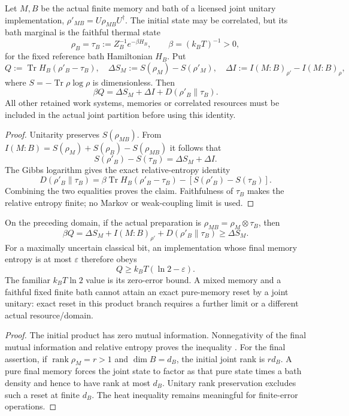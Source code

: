 \documentclass[12pt,a4paper]{article}
\begin{document}
\begin{theorem}
\label{p4:thm:v2211-correlated-landauer}
Let \(M,B\) be the actual finite memory and bath of a licensed joint
unitary implementation, \(\rho'_{MB}=U\rho_{MB}U^\dagger\).  The initial
state may be correlated, but its bath marginal is the faithful thermal state
\[
 \rho_B=\tau_B:=Z_B^{-1}e^{-\beta H_B},\qquad
 \beta=(k_BT)^{-1}>0,
\]
for the fixed reference bath Hamiltonian \(H_B\).  Put
\[
 Q:=\operatorname{Tr}H_B(\rho'_B-\tau_B),\quad
 \Delta S_M:=S(\rho_M)-S(\rho'_M),\quad
 \Delta I:=I(M:B)_{\rho'}-I(M:B)_\rho,
\]
where \(S=-\operatorname{Tr}\rho\log\rho\) is dimensionless.  Then
\begin{equation}
 \boxed{\beta Q=\Delta S_M+\Delta I+
              D(\rho'_B\|\tau_B).}
 \label{p4:eq:v2211-landauer-correlation-balance}
\end{equation}
All other retained work systems, memories or correlated resources must be
included in the actual joint partition before using this identity.
\end{theorem}
\begin{proof}
Unitarity preserves \(S(\rho_{MB})\).  From
\(I(M:B)=S(\rho_M)+S(\rho_B)-S(\rho_{MB})\) it follows that
\[
 S(\rho'_B)-S(\tau_B)=\Delta S_M+\Delta I.
\]
The Gibbs logarithm gives the exact relative-entropy identity
\[
 D(\rho'_B\|\tau_B)
 =\beta\operatorname{Tr}H_B(\rho'_B-\tau_B)
       -[S(\rho'_B)-S(\tau_B)].
\]
Combining the two equalities proves the claim.  Faithfulness of \(\tau_B\)
makes the relative entropy finite; no Markov or weak-coupling limit is used.
\end{proof}

\begin{corollary}
\label{p4:cor:v2211-product-landauer}
On the preceding domain, if the actual preparation is
\(\rho_{MB}=\rho_M\otimes\tau_B\), then
\[
 \beta Q=\Delta S_M+I(M:B)_{\rho'}+D(\rho'_B\|\tau_B)
 \ge\Delta S_M.
\]
For a maximally uncertain classical bit, an implementation whose final
memory entropy is at most \(\varepsilon\) therefore obeys
\begin{equation}
\label{p4:eq:landauer}
 \boxed{Q\ge k_BT(\ln2-\varepsilon).}
\end{equation}
The familiar \(k_BT\ln2\) value is its zero-error bound.  A mixed memory
and a faithful fixed finite bath cannot attain an exact pure-memory reset
by a joint unitary: exact reset in this product branch requires a further
limit or a different actual resource/domain.
\end{corollary}
\begin{proof}
The initial product has zero mutual information.  Nonnegativity of the
final mutual information and relative entropy proves the inequality
\cite{Landauer1961}.  For the final assertion, if
\(\operatorname{rank}\rho_M=r>1\) and \(\dim B=d_B\), the initial joint
rank is \(rd_B\).  A pure final memory forces the joint state to factor
as that pure state times a bath density and hence to have rank at most
\(d_B\).  Unitary rank preservation excludes such a reset at finite \(d_B\).
The heat inequality remains meaningful for finite-error operations.
\end{proof}
\end{document}
